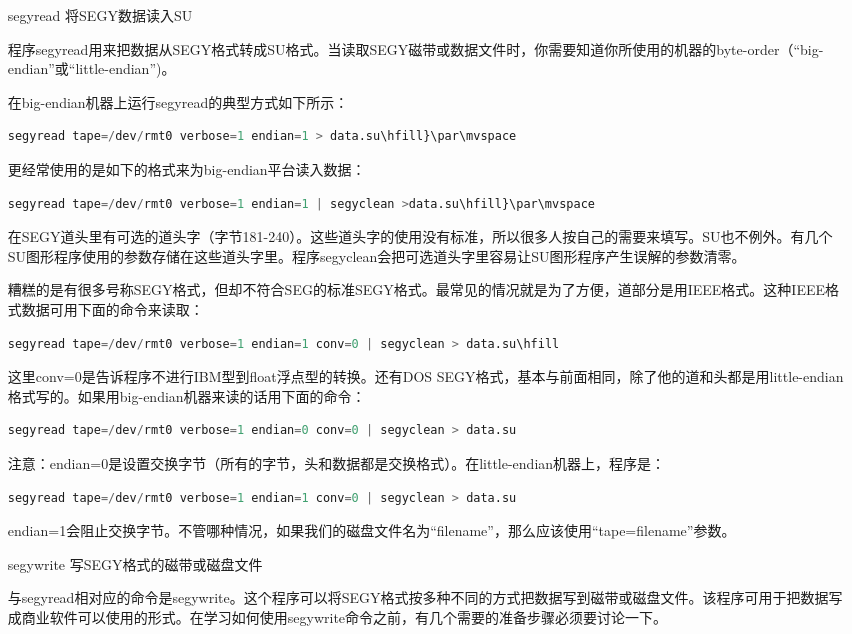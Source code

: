 \begin{enumerate}
	\item[segyread] 将SEGY数据读入SU\par
	程序segyread用来把数据从SEGY格式转成SU格式。当读取SEGY磁带或数据文件时，你需要知道你所使用的机器的byte-order（“big-endian”或“little-endian”)。\par
	在big-endian机器上运行segyread的典型方式如下所示：
\begin{lstlisting}[language=python] 
segyread tape=/dev/rmt0 verbose=1 endian=1 > data.su\hfill}\par\mvspace
\end{lstlisting}
	更经常使用的是如下的格式来为big-endian平台读入数据：\par
\begin{lstlisting}[language=python] 
segyread tape=/dev/rmt0 verbose=1 endian=1 | segyclean >data.su\hfill}\par\mvspace
\end{lstlisting}
	在SEGY道头里有可选的道头字（字节181-240）。这些道头字的使用没有标准，所以很多人按自己的需要来填写。SU也不例外。有几个SU图形程序使用的参数存储在这些道头字里。程序segyclean会把可选道头字里容易让SU图形程序产生误解的参数清零。\par
	糟糕的是有很多号称SEGY格式，但却不符合SEG的标准SEGY格式。最常见的情况就是为了方便，道部分是用IEEE格式。这种IEEE格式数据可用下面的命令来读取：\par
\begin{lstlisting}[language=python]
segyread tape=/dev/rmt0 verbose=1 endian=1 conv=0 | segyclean > data.su\hfill
\end{lstlisting}
	这里conv=0是告诉程序不进行IBM型到float浮点型的转换。还有DOS SEGY格式，基本与前面相同，除了他的道和头都是用little-endian格式写的。如果用big-endian机器来读的话用下面的命令：\par
\begin{lstlisting}[language=python]
segyread tape=/dev/rmt0 verbose=1 endian=0 conv=0 | segyclean > data.su
\end{lstlisting}
	注意：endian=0是设置交换字节（所有的字节，头和数据都是交换格式）。在little-endian机器上，程序是：\par
\begin{lstlisting}[language=python]
segyread tape=/dev/rmt0 verbose=1 endian=1 conv=0 | segyclean > data.su
\end{lstlisting}
	endian=1会阻止交换字节。不管哪种情况，如果我们的磁盘文件名为“filename”，那么应该使用“tape=filename”参数。
	
	\item[segywrite]  写SEGY格式的磁带或磁盘文件\par
	与segyread相对应的命令是segywrite。这个程序可以将SEGY格式按多种不同的方式把数据写到磁带或磁盘文件。该程序可用于把数据写成商业软件可以使用的形式。在学习如何使用segywrite命令之前，有几个需要的准备步骤必须要讨论一下。
	

\end{enumerate}
